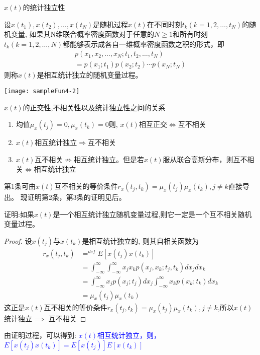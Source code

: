 \begin{frame}{$x(t)$的统计独立性}
\begin{definition}[]
设$x(t_1),x(t_2),\dots,x(t_N)$是随机过程$x(t)$在不同时刻$t_k(k=1,2,\dots,t_N)$的随机变量, 如果其N维联合概率密度函数对于任意的$N\ge 1$和所有时刻$t_k(k=1,2,\dots,N)$都能够表示成各自一维概率密度函数之积的形式，即
\begin{align*}
p(x_1,x_2,\dots,x_N; t_1,t_2,\dots,t_N)\\
=p(x_1;t_1)p(x_2;t_2)\cdots p(x_N;t_N)
\end{align*}
则称$x(t)$是相互统计独立的随机变量过程。
\end{definition}
\texttt{[image: sampleFun4-2]}
\end{frame}

\begin{frame}{$x(t)$的正交性,不相关性以及统计独立性之间的关系}
\begin{enumerate}
\item 均值$\mu_x(t_j)=0,\mu_x(t_k)=0$则, $x(t)$相互正交$\Leftrightarrow$互不相关\\
\item $x(t)$相互统计独立$\Rightarrow$互不相关
\item $x(t)$互不相关$\nRightarrow$相互统计独立。但是若$x(t)$服从联合高斯分布，则互不相关$\Leftrightarrow$相互统计独立
\end{enumerate}
第1条可由$x(t)$互不相关的等价条件$r_x(t_j,t_k)=\mu_x(t_j)\mu_x(t_k),j\ne k $直接导出。
现证明第2条，第3条的证明见后。
\end{frame}

\begin{frame}
证明:如果$x(t)$是一个相互统计独立随机变量过程,则它一定是一个互不相关随机变量过程。
\begin{proof}%
	设$x(t_j)$与$x(t_k)$是相互统计独立的, 则其自相关函数为
	\begin{align*}
	r_x(t_j,t_k)&\mathop{=}^{def}E[x(t_j)x(t_k)]\\
	&=\int_{-\infty}^{\infty}\int_{-\infty}^{\infty}x_jx_kp(x_j,x_k;t_j,t_k)dx_jdx_k\\
	&=\int_{-\infty}^{\infty}x_jp(x_j;t_j)dx_j\int_{-\infty}^{\infty}x_kp(x_k;t_k)dx_k\\
	&=\mu_x(t_j)\mu_x(t_k)
	\end{align*}
	这正是$x(t)$互不相关的等价条件$r_x(t_j,t_k)=\mu_x(t_j)\mu_x(t_k),j\ne k $,所以$x(t)$统计独立$\implies$ 互不相关
\end{proof}
由证明过程，可以得到: \textcolor{blue}{$x(t)$相互统计独立，则，$E[x(t_j)x(t_k)]=E[x(t_j)]E[x(t_k)]$}
\end{frame}

